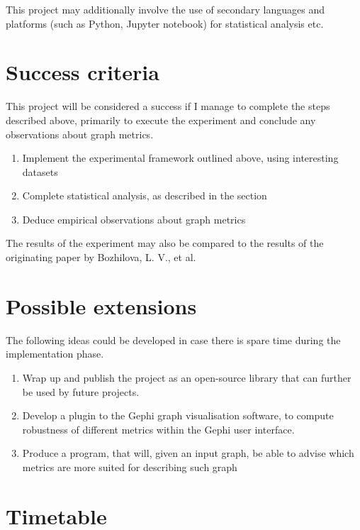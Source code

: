 \documentclass[12pt,a4paper,twoside]{article}
\begin{document}
	This project may additionally involve the use of secondary languages and platforms (such as Python, Jupyter notebook) for statistical analysis etc.

\section*{Success criteria}

	This project will be considered a success if I manage to complete the steps described above, primarily to execute the experiment and conclude any observations about graph metrics.
	
	\begin{enumerate}
	    \item Implement the experimental framework outlined above, using interesting datasets
	    \item Complete statistical analysis, as described in the  section
	    \item Deduce empirical observations about graph metrics
	\end{enumerate}
	
	The results of the experiment may also be compared to the results of the originating paper by Bozhilova, L. V., et al.

\section*{Possible extensions}

    The following ideas could be developed in case there is spare time during the implementation phase.
    
    \begin{enumerate}
        \item Wrap up and publish the project as an open-source library that can further be used by future projects.
        \item Develop a plugin to the Gephi graph visualisation software, to compute robustness of different metrics within the Gephi user interface.
        \item Produce a program, that will, given an input graph, be able to advise which metrics are more suited for describing such graph
    \end{enumerate}

\section*{Timetable}
\end{document}
